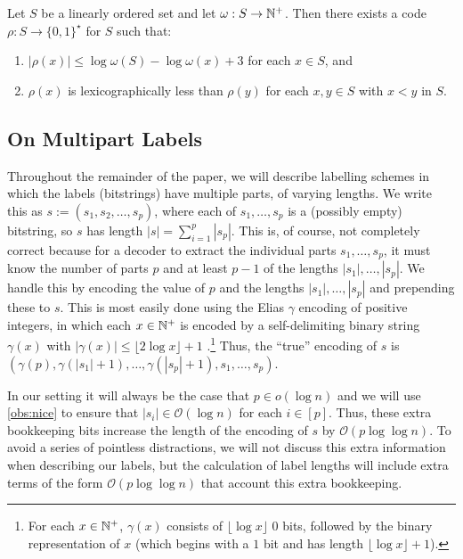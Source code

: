 \documentclass{patmorin}
\renewcommand{\le}{\leqslant}
\newcommand{\Oh}{\calO}
\newcommand{\calO}{\mathcal{O}}
\begin{document}
  \begin{cor}\label{shannon_fano_elias_code}\label{shannon_fano_elias_cor}
    Let $S$ be a linearly ordered set and let $\omega:S\to\mathbb{N}^+$.  Then there exists a code $\rho:S\to \{0,1\}^\star$ for $S$ such that:
    \begin{enumerate}[nosep,nolistsep,label=(\alph*)]
      \item $|\rho(x)|\le \log\omega(S) - \log\omega(x)+3$ for each $x\in S$, and
      \item $\rho(x)$ is lexicographically less than $\rho(y)$ for each $x,y\in S$ with $x< y$ in $S$.
    \end{enumerate}
  \end{cor}



  \subsection{On Multipart Labels}
  \label{multipart}
  
  Throughout the remainder of the paper, we will describe labelling schemes in which the labels (bitstrings) have multiple parts, of varying lengths.  We write this as $s:=(s_1,s_2,\ldots,s_p)$, where each of $s_1,\ldots,s_p$ is a (possibly empty) bitstring, so $s$ has length $|s|=\sum_{i=1}^p|s_p|$.  This is, of course, not completely correct because for a decoder to extract the individual parts $s_1,\ldots,s_p$, it must know the number of parts $p$ and at least $p-1$ of the lengths $|s_1|,\ldots,|s_p|$.  We handle this by encoding the value of $p$ and the lengths $|s_1|,\ldots,|s_{p}|$ and prepending these to $s$. This is most easily done using the Elias $\gamma$ encoding of positive integers, in which each $x\in\mathbb{N}^+$ is encoded by a self-delimiting binary string $\gamma(x)$ with $|\gamma(x)|\le \lfloor 2\log x  \rfloor  + 1$ \cite{elias:universal}.\footnote{For each $x\in\mathbb{N}^+$, $\gamma(x)$ consists of $\lfloor\log x\rfloor$ 0 bits, followed by the binary representation of $x$ (which begins with a $1$ bit and has length $\lfloor\log x\rfloor+1$).}  Thus, the ``true'' encoding of $s$ is $(\gamma(p),\gamma(|s_1|+1),\ldots,\gamma(|s_p|+1),s_1,\ldots,s_p)$.
  
  In our setting it will always be the case that $p\in o(\log n)$ and we will use \cref{obs:nice} to ensure that $|s_i|\in \Oh(\log n)$ for each $i\in[p]$. 
  Thus, these extra bookkeeping bits increase the length of the encoding of $s$ by $\Oh(p\log\log n)$.  To avoid a series of pointless distractions, we will not discuss this extra information when describing our labels, but the calculation of label lengths will include extra terms of the form $\Oh(p\log\log n)$ that account this extra bookkeeping. 
\end{document}
